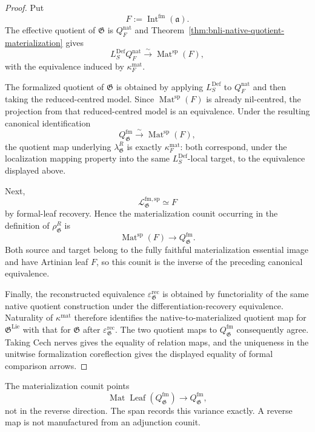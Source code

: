 \begin{proof}
Put
\[
    F:=\operatorname{Int}^{\mathrm{fm}}(\mathfrak a).
\]
The effective quotient of $\mathfrak G$ is $Q_F^{\mathrm{nat}}$ and
Theorem~\ref{thm:bnli-native-quotient-materialization} gives
\[
    L_S^{\mathrm{Def}}Q_F^{\mathrm{nat}}
    \xrightarrow{\sim}
    \operatorname{Mat}^{\mathrm{sp}}(F),
\]
with the equivalence induced by
$\kappa_F^{\mathrm{mat}}$.

The formalized quotient of $\mathfrak G$ is obtained by applying
$L_S^{\mathrm{Def}}$ to $Q_F^{\mathrm{nat}}$ and then taking the
reduced-centred model.  Since $\operatorname{Mat}^{\mathrm{sp}}(F)$ is already
nil-centred, the projection from that reduced-centred model is an
equivalence.  Under the resulting canonical identification
\[
\boxed{
    Q_{\mathfrak G}^{\mathrm{fm}}
    \xrightarrow{\sim}
    \operatorname{Mat}^{\mathrm{sp}}(F),}
\]
the quotient map underlying
$\lambda^R_{\mathfrak G}$ is exactly
$\kappa_F^{\mathrm{mat}}$: both correspond, under the localization mapping
property into the same $L_S^{\mathrm{Def}}$-local target, to the equivalence
displayed above.

Next,
\[
    \mathcal L_{\mathfrak G}^{\mathrm{fm,sp}}
    \simeq F
\]
by formal-leaf recovery.  Hence the materialization counit occurring in the
definition of $\rho^R_{\mathfrak G}$ is
\[
    \operatorname{Mat}^{\mathrm{sp}}(F)
    \longrightarrow
    Q_{\mathfrak G}^{\mathrm{fm}}.
\]
Both source and target belong to the fully faithful materialization essential
image and have Artinian leaf $F$, so this counit is the inverse of the
preceding canonical equivalence.

Finally, the reconstructed equivalence
$\varepsilon_{\mathfrak G}^{\mathrm{rec}}$ is obtained by functoriality of the
same native quotient construction under the differentiation-recovery
equivalence.  Naturality of
$\kappa^{\mathrm{mat}}$ therefore identifies the native-to-materialized
quotient map for $\mathfrak G^{\mathrm{Lie}}$ with that for $\mathfrak G$
after $\varepsilon_{\mathfrak G}^{\mathrm{rec}}$.  The two quotient maps to
$Q_{\mathfrak G}^{\mathrm{fm}}$ consequently agree.  Taking Cech nerves gives
the equality of relation maps, and the uniqueness in the unitwise
formalization coreflection gives the displayed equality of formal comparison
arrows.
\end{proof}


\begin{remark}
The materialization counit points
\[
    \operatorname{Mat}
    \operatorname{Leaf}(Q_{\mathfrak G}^{\mathrm{fm}})
    \longrightarrow
    Q_{\mathfrak G}^{\mathrm{fm}},
\]
not in the reverse direction.  The span records this variance exactly.  A
reverse map is not manufactured from an adjunction counit.
\end{remark}

